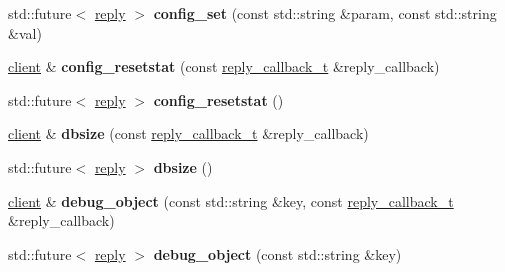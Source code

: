 \begin{DoxyCompactItemize}
\item 
\mbox{\label{classcpp__redis_1_1client_a8fdeb462b43ea6f5199145696713f9b1}} 
std\+::future$<$ \mbox{\hyperlink{classcpp__redis_1_1reply}{reply}} $>$ {\bfseries config\+\_\+set} (const std\+::string \&param, const std\+::string \&val)
\item 
\mbox{\label{classcpp__redis_1_1client_a4b1361aa6c997b76a059c144a302b5be}} 
\mbox{\hyperlink{classcpp__redis_1_1client}{client}} \& {\bfseries config\+\_\+resetstat} (const \mbox{\hyperlink{classcpp__redis_1_1client_af7a65eb21aa25230bfbb0b0203c4fc04}{reply\+\_\+callback\+\_\+t}} \&reply\+\_\+callback)
\item 
\mbox{\label{classcpp__redis_1_1client_a775508ce5220546e46b573f95d2bcb4d}} 
std\+::future$<$ \mbox{\hyperlink{classcpp__redis_1_1reply}{reply}} $>$ {\bfseries config\+\_\+resetstat} ()
\item 
\mbox{\label{classcpp__redis_1_1client_a87a8351f0a6927db52b4ab2a5b9192c9}} 
\mbox{\hyperlink{classcpp__redis_1_1client}{client}} \& {\bfseries dbsize} (const \mbox{\hyperlink{classcpp__redis_1_1client_af7a65eb21aa25230bfbb0b0203c4fc04}{reply\+\_\+callback\+\_\+t}} \&reply\+\_\+callback)
\item 
\mbox{\label{classcpp__redis_1_1client_aa9169c3c4a8b3ec5ee7b7bc601ae8a52}} 
std\+::future$<$ \mbox{\hyperlink{classcpp__redis_1_1reply}{reply}} $>$ {\bfseries dbsize} ()
\item 
\mbox{\label{classcpp__redis_1_1client_ad96e4d369e87e858fd7a8296b5cc378e}} 
\mbox{\hyperlink{classcpp__redis_1_1client}{client}} \& {\bfseries debug\+\_\+object} (const std\+::string \&key, const \mbox{\hyperlink{classcpp__redis_1_1client_af7a65eb21aa25230bfbb0b0203c4fc04}{reply\+\_\+callback\+\_\+t}} \&reply\+\_\+callback)
\item 
\mbox{\label{classcpp__redis_1_1client_a9d7a2eae091f99db6b5479577de0bf99}} 
std\+::future$<$ \mbox{\hyperlink{classcpp__redis_1_1reply}{reply}} $>$ {\bfseries debug\+\_\+object} (const std\+::string \&key)
\item 
\mbox{\label{classcpp__redis_1_1client_ac5d06ca1072ef1a83a8843c448e4d1e3}} 

\end{DoxyCompactItemize}
